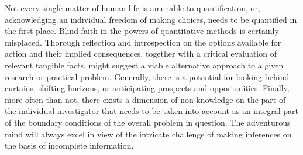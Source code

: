\medskip
\noindent
Not every single matter of human life is amenable to
quantification, or, acknowledging an individual freedom of making
choices, needs to be quantified in the first place. Blind faith in
the powers of quantitative methods is certainly misplaced. Thorough reflection and introspection on the options available for action
and their implied consequences, together with a critical evaluation
of relevant tangible facts, might suggest a viable alternative
approach to a given research or practical problem. Generally, there
is a potential for looking behind curtains, shifting horizons,
or anticipating prospects and opportunities. Finally, more often
than not, there exists a dimension of non-knowledge on the part of
the individual investigator that needs to be taken into account as
an integral part of the boundary conditions of the overall problem
in question.  The adventurous mind will always excel in view of the
intricate challenge of making inferences on the basis of incomplete 
information.


